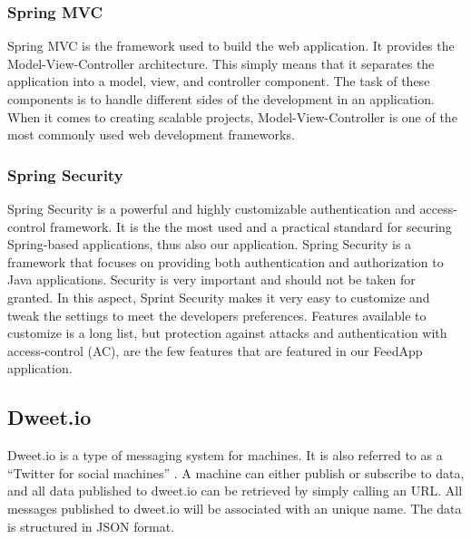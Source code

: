 \subsubsection{Spring MVC}
Spring MVC is the framework used to build the web application. It provides the Model-View-Controller architecture. This simply means that it separates the application into a model, view, and controller component. The task of these components is to handle different sides of the development in an application. When it comes to creating scalable projects, Model-View-Controller is one of the most commonly used web development frameworks.
\subsubsection{Spring Security}
Spring Security is a powerful and highly customizable authentication and access-control framework. It is the the most used and a practical standard for securing Spring-based applications, thus also our application. Spring Security is a framework that focuses on providing both authentication and authorization to Java applications.\cite{springsecurity} Security is very important and should not be taken for granted. In this aspect, Sprint Security makes it very easy to customize and tweak the settings to meet the developers preferences. Features available to customize is a long list, but protection against attacks and authentication with access-control (AC), are the few features that are featured in our FeedApp application.
\subsection{Dweet.io}
\label{sub:dweet}
Dweet.io is a type of messaging system for machines. It is also referred to as a “Twitter for social machines” \cite{dweet}. A machine can either publish or subscribe to data, and all data published to dweet.io can be retrieved by simply calling an URL. All messages published to dweet.io will be associated with an unique name. The data is structured in JSON format. 

